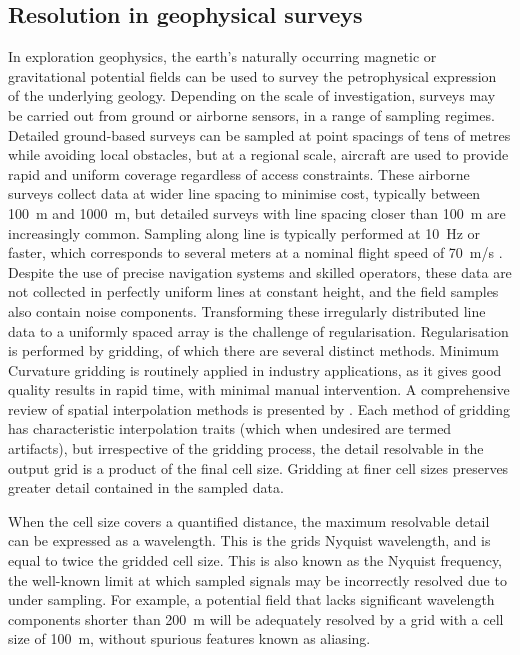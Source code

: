 \documentclass{article}
\begin{document}
\subsection{Resolution in geophysical surveys}
In exploration geophysics, the earth's naturally occurring magnetic or gravitational potential fields can be used to survey the petrophysical expression of the underlying geology.
Depending on the scale of investigation, surveys may be carried out from ground or airborne sensors, in a range of sampling regimes.
Detailed ground-based surveys can be sampled at point spacings of tens of metres while avoiding local obstacles, but at a regional scale, aircraft are used to provide rapid and uniform coverage regardless of access constraints.
These airborne surveys collect data at wider line spacing to minimise cost, typically between \SI{100}{\metre} and \SI{1000}{\metre}, but detailed surveys with line spacing closer than \SI{100}{\metre} are increasingly common.
Sampling along line is typically performed at \SI{10}{\hertz} or faster, which corresponds to several meters at a nominal flight speed of \SI{70}{\metre/\second} \parencite{goodwinAirborneMagneticRadiometric2023}.
Despite the use of precise navigation systems and skilled operators, these data are not collected in perfectly uniform lines at constant height, and the field samples also contain noise components.
Transforming these irregularly distributed line data to a uniformly spaced array is the challenge of regularisation.
Regularisation is performed by gridding, of which there are several distinct methods.
Minimum Curvature gridding \parencite{briggsMachineContouringUsing1974} is routinely applied in industry applications, as it gives good quality results in rapid time, with minimal manual intervention.
A comprehensive review of spatial interpolation methods is presented by \parencite{liReviewComparativeStudies2011}.
Each method of gridding has characteristic interpolation traits (which when undesired are termed artifacts), but irrespective of the gridding process, the detail resolvable in the output grid is a product of the final cell size.
Gridding at finer cell sizes preserves greater detail contained in the sampled data.

When the cell size covers a quantified distance, the maximum resolvable detail can be expressed as a wavelength.
This is the grids Nyquist wavelength, and is equal to twice the gridded cell size.
This is also known as the Nyquist frequency, the well-known limit at which sampled signals may be incorrectly resolved due to under sampling.
For example, a potential field that lacks significant wavelength components shorter than \SI{200}{\metre} will be adequately resolved by a grid with a cell size of \SI{100}{\metre}, without spurious features known as aliasing.
\end{document}

